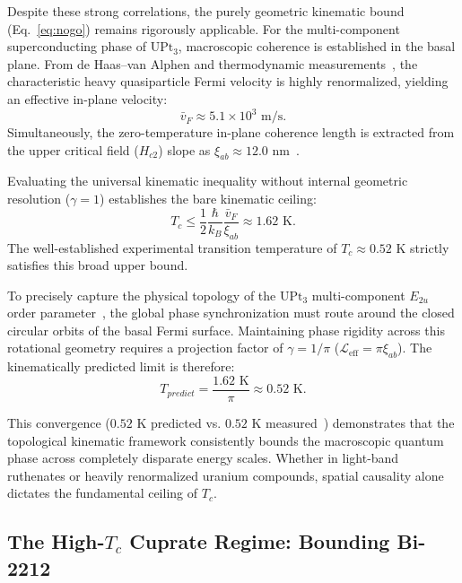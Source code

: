 \documentclass[11pt,a4paper]{article}
\begin{document}
Despite these strong correlations, the purely geometric kinematic bound (Eq.~\eqref{eq:nogo}) remains rigorously applicable. For the multi-component superconducting phase of $\text{UPt}_3$, macroscopic coherence is established in the basal plane. From de Haas–van Alphen and thermodynamic measurements~\cite{Taillefer1988, Sauls1994, Joynt2002}, the characteristic heavy quasiparticle Fermi velocity is highly renormalized, yielding an effective in-plane velocity:
\begin{equation}
\bar{v}_F \approx 5.1 \times 10^3 \text{ m/s}.
\end{equation}
Simultaneously, the zero-temperature in-plane coherence length is extracted from the upper critical field ($H_{c2}$) slope as $\xi_{ab} \approx 12.0 \text{ nm}$~\cite{Chen1993}.

Evaluating the universal kinematic inequality without internal geometric resolution ($\gamma = 1$) establishes the bare kinematic ceiling:
\begin{equation}
T_c \le \frac{1}{2}\frac{\hbar}{k_B}\frac{\bar{v}_F}{\xi_{ab}} \approx 1.62 \text{ K}.
\end{equation}
The well-established experimental transition temperature of $T_c \approx 0.52 \text{ K}$ strictly satisfies this broad upper bound.

To precisely capture the physical topology of the $\text{UPt}_3$ multi-component $E_{2u}$ order parameter~\cite{Strand2001}, the global phase synchronization must route around the closed circular orbits of the basal Fermi surface. Maintaining phase rigidity across this rotational geometry requires a projection factor of $\gamma = 1/\pi$ ($\mathcal{L}_{\text{eff}} = \pi \xi_{ab}$). The kinematically predicted limit is therefore:
\begin{equation}
T_{predict} = \frac{1.62 \text{ K}}{\pi} \approx 0.52 \text{ K}.
\end{equation}

This convergence ($0.52 \text{ K}$ predicted vs. $0.52 \text{ K}$ measured~\cite{Stewart1984, Joynt2002}) demonstrates that the topological kinematic framework consistently bounds the macroscopic quantum phase across completely disparate energy scales. Whether in light-band ruthenates or heavily renormalized uranium compounds, spatial causality alone dictates the fundamental ceiling of $T_c$.

\subsection*{The High-$T_c$ Cuprate Regime: Bounding Bi-2212}
\end{document}
